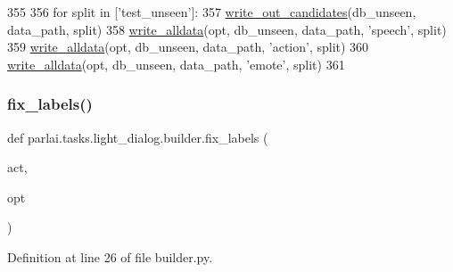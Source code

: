 \begin{DoxyCode}
355 
356     \textcolor{keywordflow}{for} split \textcolor{keywordflow}{in} [\textcolor{stringliteral}{'test\_unseen'}]:
357         \hyperlink{namespaceparlai_1_1tasks_1_1light__dialog_1_1builder_a25aca9f28e4406290624e1d0c5cce0d6}{write\_out\_candidates}(db\_unseen, data\_path, split)
358         \hyperlink{namespaceparlai_1_1tasks_1_1light__dialog_1_1builder_aeb144d0ebd2fd1727f73677e36f2c8b5}{write\_alldata}(opt, db\_unseen, data\_path, \textcolor{stringliteral}{'speech'}, split)
359         \hyperlink{namespaceparlai_1_1tasks_1_1light__dialog_1_1builder_aeb144d0ebd2fd1727f73677e36f2c8b5}{write\_alldata}(opt, db\_unseen, data\_path, \textcolor{stringliteral}{'action'}, split)
360         \hyperlink{namespaceparlai_1_1tasks_1_1light__dialog_1_1builder_aeb144d0ebd2fd1727f73677e36f2c8b5}{write\_alldata}(opt, db\_unseen, data\_path, \textcolor{stringliteral}{'emote'}, split)
361 \end{DoxyCode}
\mbox{\label{namespaceparlai_1_1tasks_1_1light__dialog_1_1builder_aafb760ba2e05ffe5cad429327d0dd347}} 
\subsubsection{\texorpdfstring{fix\+\_\+labels()}{fix\_labels()}}
{\footnotesize\ttfamily def parlai.\+tasks.\+light\+\_\+dialog.\+builder.\+fix\+\_\+labels (\begin{DoxyParamCaption}\item[{}]{act,  }\item[{}]{opt }\end{DoxyParamCaption})}



Definition at line 26 of file builder.\+py.


